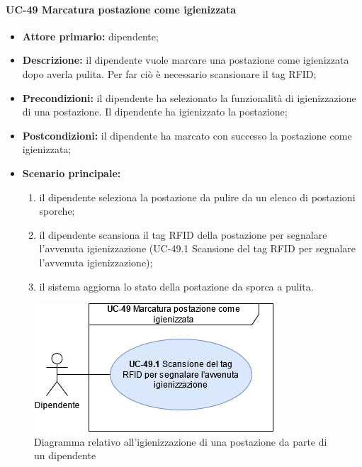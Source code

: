 \paragraph{UC-49 Marcatura postazione come igienizzata}
    \begin{itemize}
        \item \textbf{Attore primario:} dipendente;

        \item \textbf{Descrizione:} il dipendente vuole marcare una postazione come igienizzata dopo averla pulita. Per far ciò è necessario scansionare il tag RFID;

        \item \textbf{Precondizioni:} il dipendente ha selezionato la funzionalità di igienizzazione di una postazione. Il dipendente ha igienizzato la postazione;

        \item \textbf{Postcondizioni:} il dipendente ha marcato con successo la postazione come igienizzata;

        \item \textbf{Scenario principale:}
            \begin{enumerate}
                \item il dipendente seleziona la postazione da pulire da un elenco di postazioni sporche;
                \item il dipendente scansiona il tag RFID della postazione per segnalare l'avvenuta igienizzazione (UC-49.1 Scansione del tag RFID per segnalare l'avvenuta igienizzazione);
                \item il sistema aggiorna lo stato della postazione da sporca a pulita.
            \end{enumerate}
    \end{itemize} 

    \begin{figure}[H]
		\centering
		  \includegraphics[scale=0.50]{src/CasiDUso/immagini/IgienizzazioneDipendente.png}
		\caption{Diagramma relativo all'igienizzazione di una postazione da parte di un dipendente}
	\end{figure}

